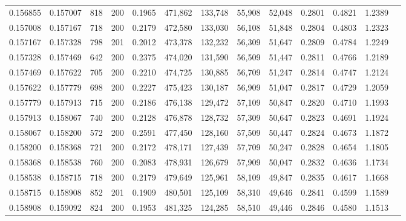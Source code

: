 \begin{tabular}{rrrrrrrrrrrrr}
0.156855 & 0.157007 &    818 & 200 &                                     0.1965 & 471,862 & 133,748 &  55,908 &  52,048 & 0.2801 & 0.4821 & 1.2389 \\
0.157008 & 0.157167 &    718 & 200 &                                     0.2179 & 472,580 & 133,030 &  56,108 &  51,848 & 0.2804 & 0.4803 & 1.2323 \\
0.157167 & 0.157328 &    798 & 201 &                                     0.2012 & 473,378 & 132,232 &  56,309 &  51,647 & 0.2809 & 0.4784 & 1.2249 \\
0.157328 & 0.157469 &    642 & 200 &                                     0.2375 & 474,020 & 131,590 &  56,509 &  51,447 & 0.2811 & 0.4766 & 1.2189 \\
0.157469 & 0.157622 &    705 & 200 &                                     0.2210 & 474,725 & 130,885 &  56,709 &  51,247 & 0.2814 & 0.4747 & 1.2124 \\
0.157622 & 0.157779 &    698 & 200 &                                     0.2227 & 475,423 & 130,187 &  56,909 &  51,047 & 0.2817 & 0.4729 & 1.2059 \\
0.157779 & 0.157913 &    715 & 200 &                                     0.2186 & 476,138 & 129,472 &  57,109 &  50,847 & 0.2820 & 0.4710 & 1.1993 \\
0.157913 & 0.158067 &    740 & 200 &                                     0.2128 & 476,878 & 128,732 &  57,309 &  50,647 & 0.2823 & 0.4691 & 1.1924 \\
0.158067 & 0.158200 &    572 & 200 &                                     0.2591 & 477,450 & 128,160 &  57,509 &  50,447 & 0.2824 & 0.4673 & 1.1872 \\
0.158200 & 0.158368 &    721 & 200 &                                     0.2172 & 478,171 & 127,439 &  57,709 &  50,247 & 0.2828 & 0.4654 & 1.1805 \\
0.158368 & 0.158538 &    760 & 200 &                                     0.2083 & 478,931 & 126,679 &  57,909 &  50,047 & 0.2832 & 0.4636 & 1.1734 \\
0.158538 & 0.158715 &    718 & 200 &                                     0.2179 & 479,649 & 125,961 &  58,109 &  49,847 & 0.2835 & 0.4617 & 1.1668 \\
0.158715 & 0.158908 &    852 & 201 &                                     0.1909 & 480,501 & 125,109 &  58,310 &  49,646 & 0.2841 & 0.4599 & 1.1589 \\
0.158908 & 0.159092 &    824 & 200 &                                     0.1953 & 481,325 & 124,285 &  58,510 &  49,446 & 0.2846 & 0.4580 & 1.1513 \\

\end{tabular}
